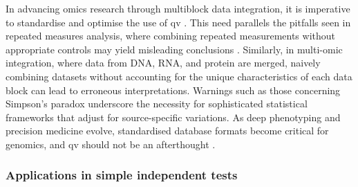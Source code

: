 In advancing omics research through multiblock data integration, it is imperative to standardise and optimise the use of \ac{qv} \cite{smilde_multiblock_2022}. This need parallels the pitfalls seen in repeated measures analysis, where combining repeated measurements without appropriate controls may yield misleading conclusions \cite{bland1994correlation}. Similarly, in multi-omic integration, where data from DNA, RNA, and protein are merged, naively combining datasets without accounting for the unique characteristics of each data block can lead to erroneous interpretations. Warnings such as those concerning Simpson's paradox \cite{simpson1951interpretation, wright1934method, pearl2016causal} underscore the necessity for sophisticated statistical frameworks that adjust for source-specific variations. As deep phenotyping and precision medicine evolve, standardised database formats become critical for genomics, and \ac{qv} should not be an afterthought \cite{bycroft2018uk, all2024genomic, ogishima2021dbtmm}.

\subsubsection{Applications in simple independent tests} 


